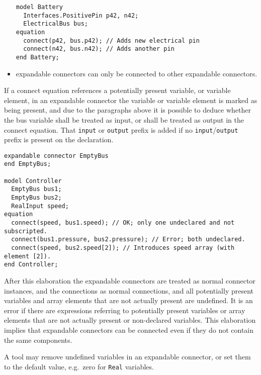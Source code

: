\begin{itemize}
\begin{example}
\begin{lstlisting}[language=modelica]
model Battery
  Interfaces.PositivePin p42, n42;
  ElectricalBus bus;
equation
  connect(p42, bus.p42); // Adds new electrical pin
  connect(n42, bus.n42); // Adds another pin
end Battery;
\end{lstlisting}
\end{example}

\item
  expandable connectors can only be connected to other expandable connectors.
\end{itemize}

If a connect equation references a potentially present variable, or variable element, in an expandable connector the variable or variable element is marked as being present, and due to the
paragraphs above it is possible to deduce whether the bus variable shall be treated as input, or shall be treated as output in the connect equation.  That \lstinline!input! or \lstinline!output!
prefix is added if no \lstinline!input!/\lstinline!output! prefix is present on the declaration.

\begin{example}
\begin{lstlisting}[language=modelica]
expandable connector EmptyBus
end EmptyBus;

model Controller
  EmptyBus bus1;
  EmptyBus bus2;
  RealInput speed;
equation
  connect(speed, bus1.speed); // OK; only one undeclared and not subscripted.
  connect(bus1.pressure, bus2.pressure); // Error; both undeclared.
  connect(speed, bus2.speed[2]); // Introduces speed array (with element [2]).
end Controller;
\end{lstlisting}
\end{example}

After this elaboration the expandable connectors are treated as normal
connector instances, and the connections as normal connections, and all
potentially present variables and array elements that are not actually
present are undefined. It is an error if there
are expressions referring to potentially present variables or array
elements that are not actually present or non-declared variables. This
elaboration implies that expandable connectors can be connected even if
they do not contain the same components.

\begin{nonnormative}
A tool may remove undefined variables in an expandable connector, or set them to the default value, e.g.\ zero for \lstinline!Real! variables.
\end{nonnormative}

